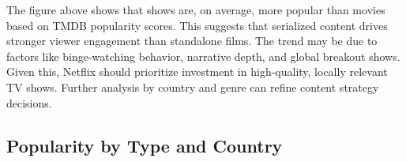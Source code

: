 \documentclass[11pt,preprint]{elsarticle}
\numberwithin{equation}{section}
\numberwithin{figure}{section}
\numberwithin{table}{section}
\begin{document}
The figure above shows that shows are, on average, more popular than
movies based on TMDB popularity scores. This suggests that serialized
content drives stronger viewer engagement than standalone films. The
trend may be due to factors like binge-watching behavior, narrative
depth, and global breakout shows. Given this, Netflix should prioritize
investment in high-quality, locally relevant TV shows. Further analysis
by country and genre can refine content strategy decisions.

\subsection{Popularity by Type and
Country}\label{popularity-by-type-and-country}

\begin{Shaded}
\begin{Highlighting}[]

\OtherTok{\textless{}{-}}\SpecialCharTok{\%\textgreater{}\%}
  \NormalTok{(}\SpecialCharTok{!}\SpecialCharTok{!}\SpecialCharTok{\%\textgreater{}\%}
  \SpecialCharTok{\%\textgreater{}\%}
  \NormalTok{(}  \NormalTok{), } \NormalTok{) }\SpecialCharTok{\%\textgreater{}\%}
  \SpecialCharTok{!=} \NormalTok{) }\SpecialCharTok{\%\textgreater{}\%}
  \NormalTok{(}

\NormalTok{(} \SpecialCharTok{+}
  \NormalTok{(} \NormalTok{) }\SpecialCharTok{+}
  \NormalTok{() }\SpecialCharTok{+}
  \NormalTok{(} \NormalTok{,}
        \NormalTok{, } \NormalTok{) }\SpecialCharTok{+}
  \NormalTok{()}
\end{Highlighting}
\end{Shaded}
\end{document}
